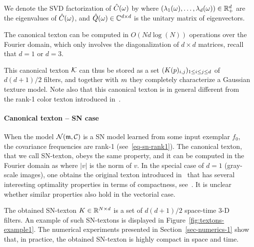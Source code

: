 
We denote the SVD factorization of $\hat {C}(\omega)$ by
where $(\lambda_1(\omega),\ldots,\lambda_d(\omega)) \in \mathbb{R}_+^d$ are the eigenvalues of $\hat {C}(\omega)$, and $\hat Q(\omega) \in \mathbb{C}^{d \times d}$ is the unitary matrix of eigenvectors.


The canonical texton can be computed in $O(Nd\log(N))$ operations over the Fourier domain,
which only involves the diagonalization of $d \times d$ matrices, recall that $d=1$ or $d=3$.

This canonical texton $\mathcal{K}$ can thus be stored as a set $(K(p)_{i,j})_{1 \leq i \leq j \leq d}$ of $d(d+1)/2$ filters, and together with $m$ they completely characterize a Gaussian texture model.  Note also that this canonical texton is in general different from the rank-1 color texton introduced in~\cite{Desolneux-Moisan-12}.


\paragraph{Canonical texton -- SN case}

When the model $\mathcal{N}({\frak m},\mathcal{C})$ is a SN model learned from some input exemplar $f_0$, the covariance frequencies are rank-1 (see~\eqref{eq-sn-rank1}). The canonical texton, that we call SN-texton, obeys the same property, and it can be computed in the Fourier domain as
where $|v|$ is the norm of $v$.
In the special case of $d=1$ (gray-scale images), one obtains the original texton introduced in~\cite{Desolneux-Moisan-12}
that has several interesting optimality properties in terms of compactness, see~\cite{Desolneux-Moisan-12}. It is unclear whether similar properties also hold in the vectorial case.

The obtained SN-texton $K \in \mathbb{R}^{N \times d}$ is a set of $d(d+1)/2$ space-time 3-D filters.
An example of such SN-textons is displayed in Figure~\ref{fig:textons-example1}. The numerical experiments presented in Section~\ref{sec-numerics-1} show that, in practice, the obtained SN-texton is highly compact in space and time.


